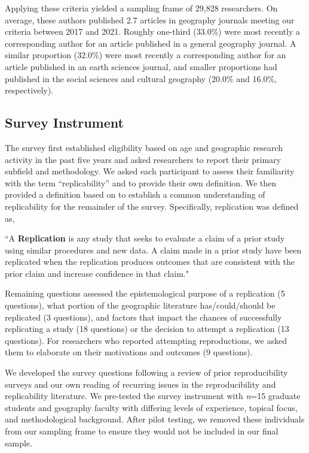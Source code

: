\documentclass[]{interact}
\theoremstyle{plain}%
\theoremstyle{definition}
\theoremstyle{remark}
\begin{document}
Applying these criteria yielded a sampling frame of 29,828 researchers. 
On average, these authors published 2.7 articles in geography journals meeting our criteria between 2017 and 2021. 
Roughly one-third (33.0\%) were most recently a corresponding author for an article published in a general geography journal. 
A similar proportion (32.0\%) were most recently a corresponding author for an article published in an earth sciences journal, and smaller proportions had published in the social sciences and cultural geography (20.0\% and 16.0\%, respectively).

\subsection*{Survey Instrument}
The survey first established eligibility based on age and geographic research activity in the past five years and asked researchers to report their primary subfield and methodology.
We asked each participant to assess their familiarity with the term ``replicability'' and to provide their own definition. 
We then provided a definition based on \citet{nosek2020} to establish a common understanding of replicability for the remainder of the survey.
Specifically, replication was defined as,

\begin{displayquote}
    ``A \textbf{Replication} is any study that seeks to evaluate a claim of a prior study using similar procedures and new data. A claim made in a prior study have been replicated when the replication produces outcomes that are consistent with the prior claim and increase confidence in that claim."
\end{displayquote}

\noindent Remaining questions assessed the epistemological purpose of a replication (5 questions), what portion of the geographic literature has/could/should be replicated (3 questions), and factors that impact the chances of successfully replicating a study (18 questions) or the decision to attempt a replication (13 questions).
For researchers who reported attempting reproductions, we asked them to elaborate on their motivations and outcomes (9 questions).

We developed the survey questions following a review of prior reproducibility surveys \citep[e.g.,][]{fanelli2009many,baker20161, konkol2019} and our own reading of recurring issues in the reproducibility and replicability literature. 
We pre-tested the survey instrument with \textit{n}=15 graduate students and geography faculty with differing levels of experience, topical focus, and methodological background. 
After pilot testing, we removed these individuals from our sampling frame to ensure they would not be included in our final sample.
\end{document}
